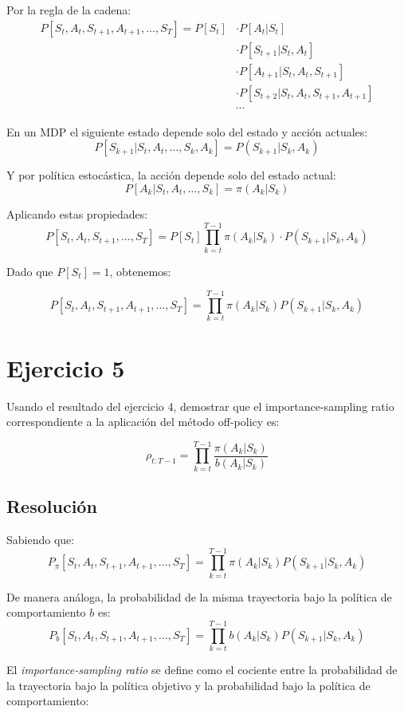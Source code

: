 \documentclass[12pt,a4paper]{article}
\begin{document}
Por la regla de la cadena:
\begin{align*}
P[S_t, A_t, S_{t+1}, A_{t+1}, \ldots, S_T] = P[S_t] &\cdot P[A_t|S_t] \\
&\cdot P[S_{t+1}|S_t, A_t] \\
&\cdot P[A_{t+1}|S_t, A_t, S_{t+1}] \\
&\cdot P[S_{t+2}|S_t, A_t, S_{t+1}, A_{t+1}] \\
&\cdots
\end{align*}

En un MDP el siguiente estado depende solo del estado y acción actuales:
$$P[S_{k+1}|S_t, A_t, \ldots, S_k, A_k] = P(S_{k+1}|S_k, A_k)$$
    
Y por política estocástica, la acción depende solo del estado actual:
$$P[A_k|S_t, A_t, \ldots, S_k] = \pi(A_k|S_k)$$

Aplicando estas propiedades:
$$P[S_t, A_t, S_{t+1}, \ldots, S_T] = P[S_t] \prod_{k=t}^{T-1} \pi(A_k|S_k) \cdot P(S_{k+1}|S_k, A_k)$$

Dado que $P[S_t] = 1$, obtenemos:

$$P[S_t, A_t, S_{t+1}, A_{t+1}, \ldots, S_T] = \prod_{k=t}^{T-1} \pi(A_k|S_k)P(S_{k+1}|S_k, A_k)$$


\section{Ejercicio 5}

Usando el resultado del ejercicio 4, demostrar que el importance-sampling ratio 
correspondiente a la aplicación del método off-policy es:

$$ \rho_{t:T-1} = \prod_{k=t}^{T-1} \frac{\pi(A_k|S_k)}{b(A_k|S_k)} $$

\subsection{Resolución}

Sabiendo que:
$$P_{\pi}[S_t, A_t, S_{t+1}, A_{t+1}, \ldots, S_T] = \prod_{k=t}^{T-1} \pi(A_k|S_k)P(S_{k+1}|S_k, A_k)
$$

De manera análoga, la probabilidad de la misma trayectoria bajo la política de comportamiento $b$ es:
$$P_{b}[S_t, A_t, S_{t+1}, A_{t+1}, \ldots, S_T] = \prod_{k=t}^{T-1} b(A_k|S_k)P(S_{k+1}|S_k, A_k)$$

El \textit{importance-sampling ratio} se define como el cociente entre la probabilidad de la trayectoria bajo la política objetivo y la probabilidad bajo la política de comportamiento:
\end{document}
